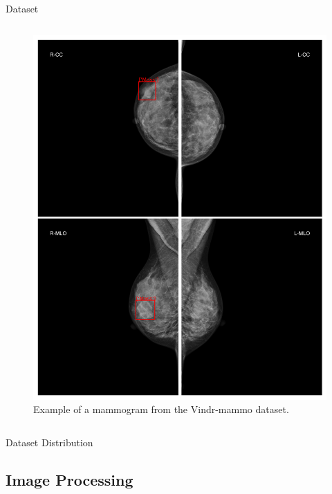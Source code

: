 \begin{frame}{Dataset}
\begin{columns}
        \begin{column}{0.5\textwidth}
            \begin{figure}
                \centering
                \includegraphics[height=0.5\textheight,keepaspectratio]{imagenes/vista_vindr.png}
                \caption{Example of a mammogram from the Vindr-mammo dataset.}
            \end{figure}
        \end{column}
    \end{columns}
\end{frame}

\begin{frame}{Dataset Distribution}
    
\end{frame}

\subsection{Image Processing}

